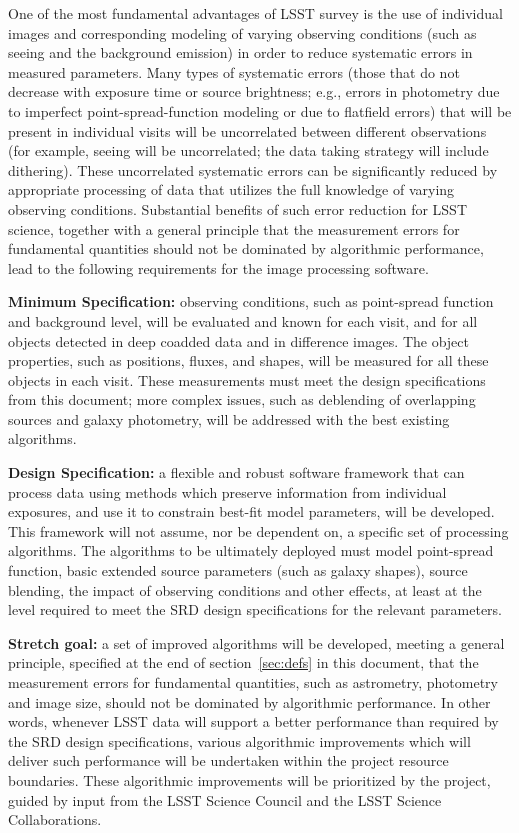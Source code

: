 One of the most fundamental advantages of LSST survey is the use of individual
images and corresponding modeling of varying observing conditions (such as seeing
and the background emission) in order to reduce systematic errors in measured
parameters.  Many types of systematic errors (those that do not decrease with
exposure time or source brightness; e.g., errors in photometry due to imperfect
point-spread-function modeling or due to flatfield errors) that will be present in
individual visits will be uncorrelated between different observations (for example,
seeing will be uncorrelated; the data taking strategy will include dithering). These
uncorrelated systematic errors can be significantly reduced by appropriate processing
of data that utilizes the full knowledge of varying observing conditions. Substantial
benefits of such error reduction for LSST science,  together with a general principle
that the measurement errors for fundamental quantities should not be dominated
by algorithmic performance, lead to the following requirements for the image
processing software.

{\bf Minimum Specification:} observing conditions, such as point-spread function and
background level, will be evaluated and known for each visit, and for all objects
detected in deep coadded data and in difference images. The object properties,
such as positions, fluxes, and shapes, will be measured for all these objects in
each visit. These measurements must meet the design specifications from this
document; more complex issues, such as deblending of overlapping sources
and galaxy photometry, will be addressed with the best existing algorithms.

{\bf Design Specification:} a flexible and robust software framework that can process
data using methods which preserve information from individual exposures, and
use it to constrain best-fit model parameters, will be developed.
This framework will not assume, nor be dependent on, a specific
set of processing algorithms. The algorithms to be ultimately deployed must model
point-spread function, basic extended source parameters (such as galaxy shapes),
source blending, the impact of observing conditions and other effects, at least at
the level required to meet the SRD design specifications for the relevant parameters.

{\bf Stretch goal:} a set of improved algorithms will be developed, meeting a general principle,
specified at the end of section~\ref{sec:defs} in this document, that the measurement errors for
fundamental quantities, such as astrometry, photometry and image size, should not be dominated
by algorithmic performance. In other words, whenever LSST data
will support a better performance than required by the SRD design specifications,
various algorithmic improvements which will deliver such performance will be
undertaken within the project resource boundaries. These algorithmic improvements
will be prioritized by the project, guided by input from the
LSST Science Council and the LSST Science Collaborations.

